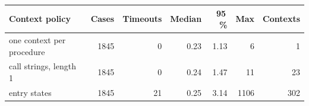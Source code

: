 \begin{tabular}{@{}lrrrrrr@{}}
\toprule
Context policy & Cases & Timeouts & Median & 95\,\% & Max & Contexts \\
\midrule
one context per procedure & 1845 & 0 & 0.23 & 1.13 & 6 & 1 \\
call strings, length 1 & 1845 & 0 & 0.24 & 1.47 & 11 & 23 \\
entry states & 1845 & 21 & 0.25 & 3.14 & 1106 & 302 \\
\bottomrule
\end{tabular}
